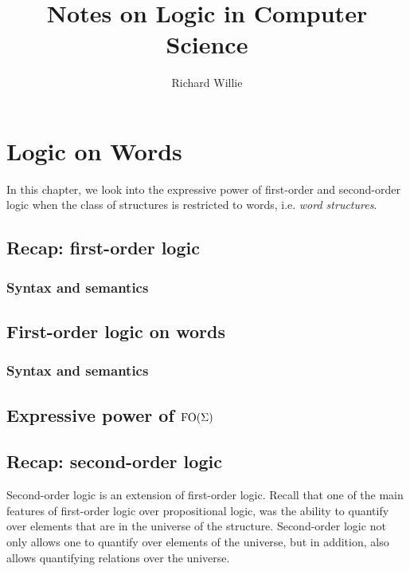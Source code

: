 \documentclass[11pt,twoside=off,numbers=noenddot]{scrbook}
\title{Notes on Logic in Computer Science}
\author{Richard Willie}
\begin{document}
\maketitle

\tableofcontents

\newpage

\chapter{Logic on Words}
In this chapter, we look into the expressive power of first-order and second-order logic when the class of structures is restricted to words, i.e. \emph{word structures}.

\section{Recap: first-order logic}

\subsection{Syntax and semantics}

\section{First-order logic on words}

\subsection{Syntax and semantics}

\section{Expressive power of $\text{FO}(\Sigma)$}

\section{Recap: second-order logic}
Second-order logic is an extension of first-order logic. Recall that one of the main features of first-order logic over propositional logic, was the ability to quantify over elements that are in the universe of the structure. Second-order logic not only allows one to quantify over elements of the universe, but in addition, also allows quantifying relations over the universe.
\end{document}
